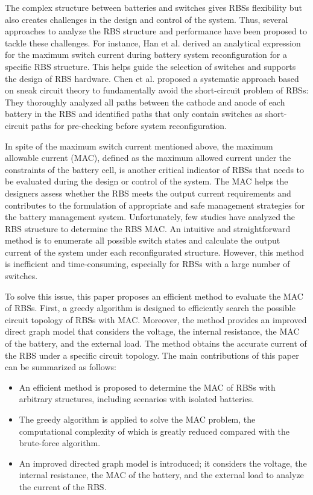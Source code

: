 \documentclass{article}
\begin{document}
The complex structure between batteries and switches gives RBSs flexibility but also creates challenges in the design and control of the system. 
Thus, several approaches to analyze the RBS structure and performance have been proposed to tackle these challenges.
For instance, 
Han et al. \cite{han2021analysis} derived an analytical expression for the maximum switch current during battery system reconfiguration for a specific RBS structure. 
This helps guide the selection of switches and supports the design of RBS hardware.
Chen et al. \cite{chenSneakCircuitTheory2021} proposed a systematic approach based on  sneak circuit theory to fundamentally avoid the short-circuit problem of RBSs: 
They thoroughly analyzed all paths between the cathode and anode of each battery in the RBS and identified paths that only contain switches as short-circuit paths for pre-checking before system reconfiguration. 


In spite of the maximum switch current mentioned above, the maximum allowable current (MAC), defined as the maximum allowed current  under the constraints of the battery cell, is another critical indicator of RBSs that needs to be evaluated during the design or control  of the system. 
The MAC helps the designers assess whether the RBS meets the output current requirements and contributes to the formulation of appropriate and safe management strategies for the battery management system.
Unfortunately, few studies have analyzed the RBS structure to determine the RBS MAC.
An intuitive and straightforward method is to enumerate all possible switch states and calculate the output current of the system under each reconfigurated structure.
However, this method is inefficient and time-consuming, especially for RBSs with a large number of switches.


To solve this issue, this paper proposes an efficient method to evaluate the MAC of RBSs. 
First, a greedy algorithm is designed to efficiently search the possible circuit topology of RBSs with MAC.
Moreover, the method provides an improved direct graph model that considers the voltage, the internal resistance, the MAC of the battery, and the external load. The method obtains the accurate current of the RBS under a specific circuit topology. 
The main contributions of this paper can be summarized as follows:
\begin{itemize}
  \item An efficient method is proposed to determine the MAC of RBSs with arbitrary structures, including scenarios with isolated batteries.
  \item The greedy algorithm is applied to solve the MAC problem, the computational complexity of which is greatly reduced compared with the brute-force algorithm.
  \item An improved directed graph model is introduced; it considers the voltage, the internal resistance, the MAC of the battery, and the external load to analyze the current of the RBS.
\end{itemize}
\end{document}
